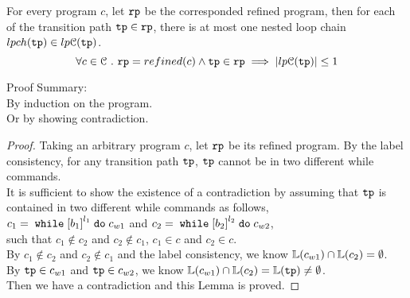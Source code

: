   \begin{lem}
    \label{lem:lpch_unique}
    For every program $c$, let $\mathtt{rp}$ be the corresponded refined program, 
    then for each of the transition path $\mathtt{tp} \in \mathtt{rp}$, there is at most one nested loop chain $lpch(\mathtt{tp}) \in lp\mathcal{C}(\mathtt{tp})$.
    \[
      \forall c \in \mathcal{C} ~.~ \mathtt{rp} = refined(c) \land \mathtt{tp} \in \mathtt{rp} \implies 
      |lp\mathcal{C}(\mathtt{tp})| \leq 1\]
  \end{lem}
  Proof Summary:
  \\
  By induction on the program.
  \\
  Or by showing contradiction.
  \begin{proof}
    Taking an arbitrary program $c$, let $\mathtt{rp}$ be its  refined program.
    By the label consistency, for any transition path $\mathtt{tp}$, $\mathtt{tp}$ cannot be in two different while commands.
    \\
    It is sufficient to show the existence of a contradiction by assuming that 
    $\mathtt{tp}$ is contained in two different while commands as follows,
    \\
    $c_1 = \ewhile \clabel{b_1}^{l_1} \edo c_{w1}$ and $c_2 = \ewhile \clabel{b_2}^{l_2} \edo c_{w2}$, 
    \\
    such that $c_1 \not\in c_2$ and $c_2 \not\in c_1$,
    $c_1 \in c$ and $c_2 \in c$.
    \\
    By $c_1 \not\in c_2$ and $c_2 \not\in c_1$ and the label consistency, we know 
    $\mathbb{L}(c_{w1}) \cap \mathbb{L}(c_2) = \emptyset$.
    \\
    By $\mathtt{tp} \in c_{w1}$ and $\mathtt{tp} \in c_{w2}$, we know 
    $\mathbb{L}(c_{w1}) \cap \mathbb{L}(c_2) = \mathbb{L}(\mathtt{tp}) \neq \emptyset$.
    \\
    Then we have a contradiction and this Lemma is proved.    
  \end{proof}